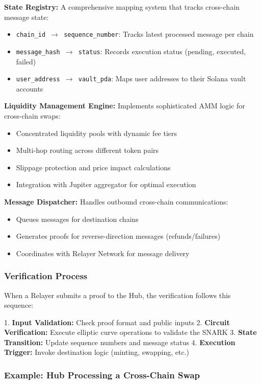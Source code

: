 \documentclass[11pt,a4paper]{article}
\begin{document}
\textbf{State Registry:} A comprehensive mapping system that tracks cross-chain message state:
\begin{itemize}
    \item \texttt{chain\_id $\rightarrow$ sequence\_number}: Tracks latest processed message per chain
    \item \texttt{message\_hash $\rightarrow$ status}: Records execution status (pending, executed, failed)
    \item \texttt{user\_address $\rightarrow$ vault\_pda}: Maps user addresses to their Solana vault accounts
\end{itemize}

\textbf{Liquidity Management Engine:} Implements sophisticated AMM logic for cross-chain swaps:
\begin{itemize}
    \item Concentrated liquidity pools with dynamic fee tiers
    \item Multi-hop routing across different token pairs
    \item Slippage protection and price impact calculations
    \item Integration with Jupiter aggregator for optimal execution
\end{itemize}

\textbf{Message Dispatcher:} Handles outbound cross-chain communications:
\begin{itemize}
    \item Queues messages for destination chains
    \item Generates proofs for reverse-direction messages (refunds/failures)
    \item Coordinates with Relayer Network for message delivery
\end{itemize}

\subsubsection*{Verification Process}

When a Relayer submits a proof to the Hub, the verification follows this sequence:

1. \textbf{Input Validation:} Check proof format and public inputs
2. \textbf{Circuit Verification:} Execute elliptic curve operations to validate the SNARK
3. \textbf{State Transition:} Update sequence numbers and message status
4. \textbf{Execution Trigger:} Invoke destination logic (minting, swapping, etc.)

\subsubsection*{Example: Hub Processing a Cross-Chain Swap}
\end{document}

